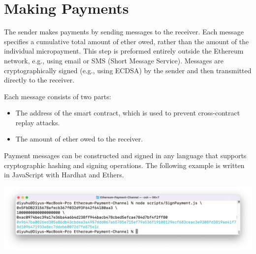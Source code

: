 \section{Making Payments}\label{sec:making-payments}
The sender makes payments by sending messages to the receiver.
Each message specifies a cumulative total amount of ether owed, rather than the amount of the individual micropayment.
This step is preformed entirely outside the Ethereum network, e.g., using email or SMS (Short Message Service).
Messages are cryptographically signed (e.g., using ECDSA) by the sender and then transmitted directly to the receiver.

Each message consists of two parts:
\begin{itemize}
    \item The address of the smart contract, which is used to prevent cross-contract replay attacks.
    \item The amount of ether owed to the receiver.
\end{itemize}

Payment messages can be constructed and signed in any language that supports cryptographic hashing and signing
operations.
The following example is written in JavaScript with Hardhat and Ethers.

\includegraphics[width=\textwidth]{./images/sign-message-example}